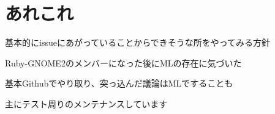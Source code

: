 \section{あれこれ}

\begin{frame}
\begin{itemize}
{\Large
\item 基本的にissueにあがっていることからできそうな所をやってみる方針
\item Ruby-GNOME2のメンバーになった後にMLの存在に気づいた
\item 基本Githubでやり取り、突っ込んだ議論はMLですることも
\item 主にテスト周りのメンテナンスしています
}
\end{itemize}
\end{frame}
